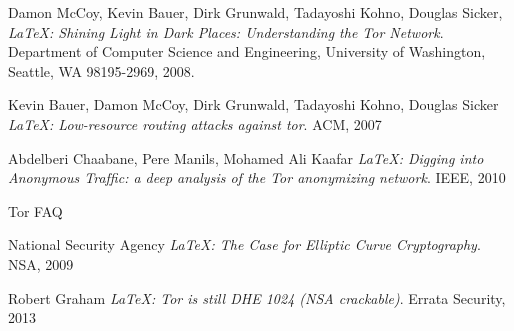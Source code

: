 \documentclass[journal]{IEEEtran}
\begin{document}
\begin{thebibliography}{9}

  Damon McCoy, Kevin Bauer, Dirk Grunwald, Tadayoshi Kohno, Douglas Sicker,
  \emph{\LaTeX: Shining Light in Dark Places: Understanding the Tor Network}.
  Department of Computer Science and Engineering,
  University of Washington, Seattle, WA 98195-2969,
  2008.

  Kevin Bauer, Damon McCoy, Dirk Grunwald, Tadayoshi Kohno, Douglas Sicker
  \emph{\LaTeX: Low-resource routing attacks against tor}.
  ACM, 2007

  Abdelberi Chaabane, Pere Manils, Mohamed Ali Kaafar
  \emph{\LaTeX: Digging into Anonymous Trafﬁc: a deep analysis of the Tor anonymizing network}.
  IEEE, 2010

  Tor FAQ

  National Security Agency
  \emph{\LaTeX: The Case for Elliptic Curve Cryptography}.
  NSA, 2009

  Robert Graham
  \emph{\LaTeX: Tor is still DHE 1024 (NSA crackable)}.
  Errata Security, 2013

\end{thebibliography}
\end{document}
